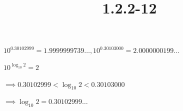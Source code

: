 \documentclass{article}
\title{1.2.2-12}
\begin{document}
\maketitle

\( 10^{0.30102999} = 1.9999999739\ldots , 10^{0.30103000} = 2.0000000199\ldots \)

\( 10^{\log_{10} 2} = 2 \)

\( \implies 0.30102999 < \log_{10} 2 < 0.30103000 \)

\( \implies \log_{10} 2 = 0.30102999\ldots \)
\end{document}
